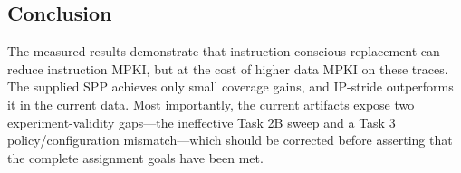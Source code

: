 \documentclass[11pt]{article}
\begin{document}
\subsection{Conclusion}
The measured results demonstrate that instruction-conscious replacement can reduce instruction MPKI, but at the cost of higher data MPKI on these traces. The supplied SPP achieves only small coverage gains, and IP-stride outperforms it in the current data. Most importantly, the current artifacts expose two experiment-validity gaps—the ineffective Task 2B sweep and a Task 3 policy/configuration mismatch—which should be corrected before asserting that the complete assignment goals have been met.
\end{document}
